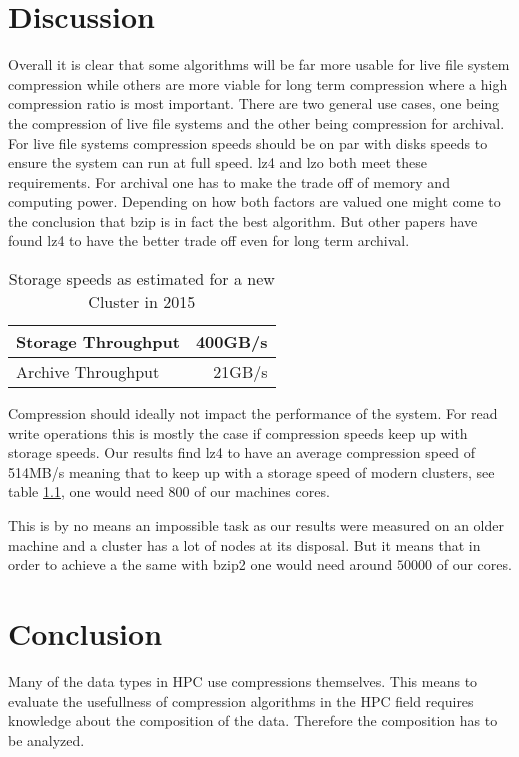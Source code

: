 \documentclass[
	12pt,
	a4paper,
	BCOR10mm,
	DIV14,
	listof=totoc,
	bibliography=totoc,
	headsepline
]{scrreprt}
\begin{document}
\chapter{Discussion}
\label{Discussion}
Overall it is clear that some algorithms will be far more usable for live file system compression while others are more viable for long term compression where a high compression ratio is most important.
There are two general use cases, one being the compression of live file systems and the other being compression for archival.
For live file systems compression speeds should be on par with disks speeds to ensure the system can run at full speed.
lz4 and lzo both meet these requirements.
For archival one has to make the trade off of memory and computing power. Depending on how both factors are valued one might come to the conclusion that bzip is in fact the best algorithm. But other papers have found lz4 to have the better trade off even for long term archival. %

\begin{table}
\begin{center}
\begin{tabular}{|l|r|}
    \hline
    Storage Throughput & 400GB/s \\
    \hline
    Archive Throughput &  21GB/s \\
    \hline
\end{tabular}
\caption{Storage speeds as estimated for a new Cluster in 2015 \cite{ExaStoSy}}
\label{tab:storage_speeds}
\end{center}
\end{table}

Compression should ideally not impact the performance of the system. 
For read write operations this is mostly the case if compression speeds keep up with storage speeds.
Our results find lz4 to have an average compression speed of 514MB/s meaning that to keep up with a storage speed of modern clusters, see table \ref{tab:storage_speeds}, one would need 800 of our machines cores. 

This is by no means an impossible task as our results were measured on an older machine and a cluster has a lot of nodes at its disposal. But it means that in order to achieve a the same with bzip2 one would need around $50000$ of our cores.

\chapter{Conclusion}
\label{Conclusion}
Many of the data types in HPC use compressions themselves.
This means to evaluate the usefullness of compression algorithms in the HPC field requires knowledge about the composition of the data.
Therefore the composition has to be analyzed.
\end{document}
